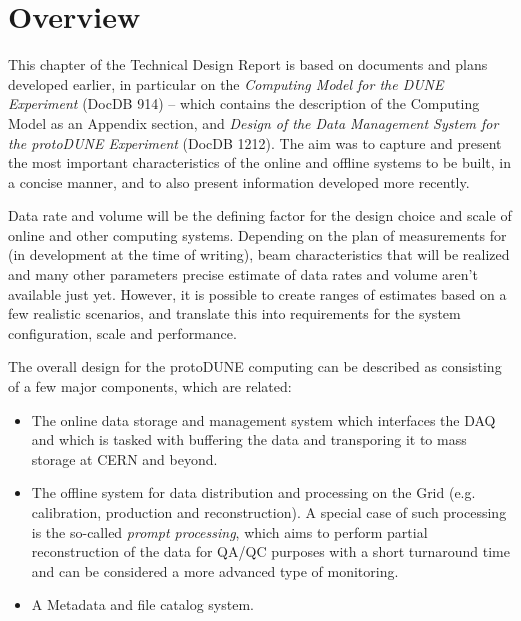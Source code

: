 \section{Overview}

This chapter of the Technical Design Report is based on documents and plans developed earlier, in particular
on the \textit{Computing Model for the DUNE Experiment} (DocDB 914) -- which contains the description
of the \pd Computing Model as an Appendix section, and \textit{Design of the Data Management System for the protoDUNE Experiment}
(DocDB 1212). The aim was to capture and present the most important characteristics of the online and offline systems to be built, in a concise manner,
and to also present information developed more recently.

Data rate and volume will be the defining factor for the design choice and scale of \pd online and other computing systems.
Depending on the plan of measurements for \pd
(in development at the time of writing), beam characteristics that will be realized
and many other parameters precise estimate of data rates and volume aren't available just yet. However, it is possible to create ranges
of estimates based on a few realistic scenarios, and translate this into requirements for the system configuration, scale and
performance.

The overall design for the protoDUNE computing can be described as consisting of a few major components, which are related:
\begin{itemize}

\item The online data storage and management system which interfaces the DAQ and which is tasked with buffering
the data and transporing it to mass storage at CERN and beyond.

\item The offline system for data distribution and processing on the Grid (e.g. calibration, production and reconstruction). A special case
of such processing is the so-called \textit{prompt processing}, which aims to perform partial reconstruction of the data for QA/QC purposes
with a short turnaround time and can be considered a more advanced type of monitoring.

\item  A Metadata and file catalog system.
\end{itemize}




